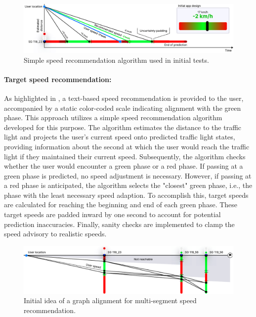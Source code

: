 \begin{figure}[htbp]
\centering
\includegraphics[width=\linewidth]{images/graph-based-speed-recommendation.pdf}
\caption{Simple speed recommendation algorithm used in initial tests.}
\label{fig:graph-based-speed-recommendation}
\end{figure}

\paragraph{Target speed recommendation:} As highlighted in , a text-based speed recommendation is provided to the user, accompanied by a static color-coded scale indicating alignment with the green phase. This approach utilizes a simple speed recommendation algorithm developed for this purpose. The algorithm estimates the distance to the traffic light and projects the user's current speed onto predicted traffic light states, providing information about the second at which the user would reach the traffic light if they maintained their current speed. Subsequently, the algorithm checks whether the user would encounter a green phase or a red phase. If passing at a green phase is predicted, no speed adjustment is necessary. However, if passing at a red phase is anticipated, the algorithm selects the "closest" green phase, i.e., the phase with the least necessary speed adaption. To accomplish this, target speeds are calculated for reaching the beginning and end of each green phase. These target speeds are padded inward by one second to account for potential prediction inaccuracies. Finally, sanity checks are implemented to clamp the speed advisory to realistic speeds.

\begin{figure}[htbp]
\centering
\includegraphics[width=\linewidth]{images/multi-segment-approach.pdf}
\caption{Initial idea of a graph alignment for multi-segment speed recommendation.}
\label{fig:multi-segment-approach}
\end{figure}

